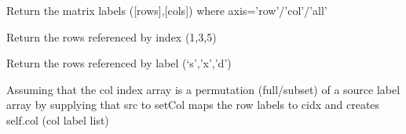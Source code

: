 \documentclass[letterpaper,10pt,english]{sphinxmanual}
\begin{document}
\begin{fulllineitems}
\begin{fulllineitems}
\end{fulllineitems}


\begin{fulllineitems}
\label{\detokenize{modules_doc:cbmpy.CBCommon.StructMatrix.getLabels}}
\pysigstartsignatures
{}
\pysigstopsignatures
\sphinxAtStartPar
Return the matrix labels ({[}rows{]},{[}cols{]}) where axis=’row’/’col’/’all’

\end{fulllineitems}


\begin{fulllineitems}
\label{\detokenize{modules_doc:cbmpy.CBCommon.StructMatrix.getRowsByIdx}}
\pysigstartsignatures
{}
\pysigstopsignatures
\sphinxAtStartPar
Return the rows referenced by index (1,3,5)

\end{fulllineitems}


\begin{fulllineitems}
\label{\detokenize{modules_doc:cbmpy.CBCommon.StructMatrix.getRowsByName}}
\pysigstartsignatures
{}
\pysigstopsignatures
\sphinxAtStartPar
Return the rows referenced by label (‘s’,’x’,’d’)

\end{fulllineitems}


\begin{fulllineitems}
\label{\detokenize{modules_doc:cbmpy.CBCommon.StructMatrix.setCol}}
\pysigstartsignatures
{}
\pysigstopsignatures
\sphinxAtStartPar
Assuming that the col index array is a permutation (full/subset)
of a source label array by supplying that src to setCol
maps the row labels to cidx and creates self.col (col label list)


\end{fulllineitems}
\end{fulllineitems}
\end{document}
